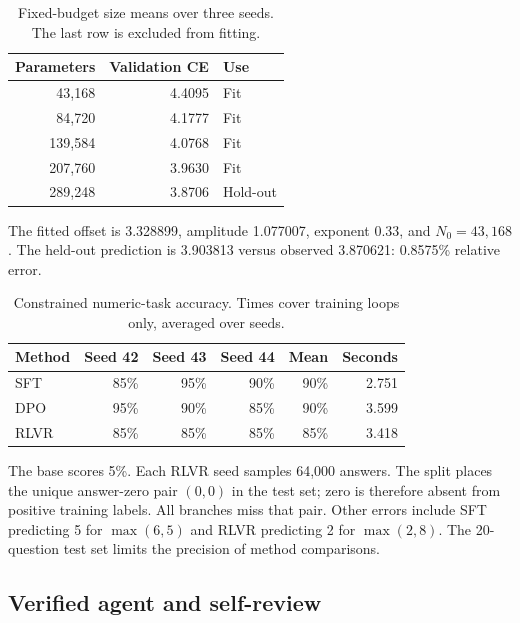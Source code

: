 \documentclass{article}
\begin{document}
\begin{table}[t]
\centering
\caption{Fixed-budget size means over three seeds. The last row is
excluded from fitting.}
\begin{tabular}{rrl}
\toprule
Parameters & Validation CE & Use\\
\midrule
43,168 & 4.4095 & Fit\\
84,720 & 4.1777 & Fit\\
139,584 & 4.0768 & Fit\\
207,760 & 3.9630 & Fit\\
289,248 & 3.8706 & Hold-out\\
\bottomrule
\end{tabular}
\end{table}
The fitted offset is 3.328899, amplitude 1.077007, exponent 0.33,
and $N_0=43,168$. The held-out prediction is 3.903813 versus
observed 3.870621: 0.8575\% relative error.

\begin{table}[t]
\centering
\caption{Constrained numeric-task accuracy. Times cover training
loops only, averaged over seeds.}
\begin{tabular}{lrrrrr}
\toprule
Method & Seed 42 & Seed 43 & Seed 44 & Mean & Seconds\\
\midrule
SFT & 85\% & 95\% & 90\% & 90\% & 2.751\\
DPO & 95\% & 90\% & 85\% & 90\% & 3.599\\
RLVR & 85\% & 85\% & 85\% & 85\% & 3.418\\
\bottomrule
\end{tabular}
\end{table}
The base scores 5\%. Each RLVR seed samples 64,000 answers.
The split places the unique answer-zero pair $(0,0)$ in the test set;
zero is therefore absent from positive training labels. All branches
miss that pair. Other errors include SFT predicting 5 for
$\max(6,5)$ and RLVR predicting 2 for $\max(2,8)$.
The 20-question test set limits the precision of method comparisons.

\subsection{Verified agent and self-review}
\end{document}
